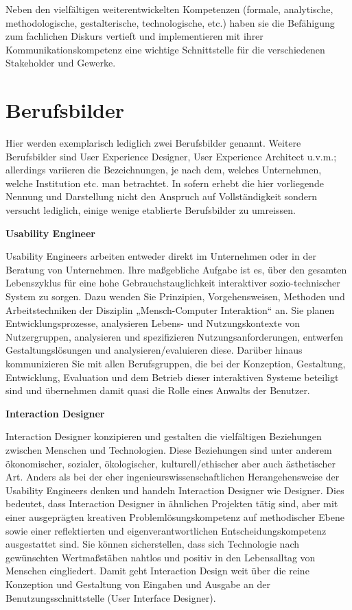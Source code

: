 Neben den vielfältigen weiterentwickelten Kompetenzen (formale,
analytische, methodologische, gestalterische, technologische, etc.)
haben sie die Befähigung zum fachlichen Diskurs vertieft und
implementieren mit ihrer Kommunikationskompetenz eine wichtige
Schnittstelle für die verschiedenen Stakeholder und Gewerke.

\section*{Berufsbilder\label{/mi-2017/modulbeschreibungen-master/schwerpunkt-human-computer-interaction}}\label{berufsbilderpathlabelmi-2017modulbeschreibungen-masterschwerpunkt-human-computer-interaction}

Hier werden exemplarisch lediglich zwei Berufsbilder genannt. Weitere
Berufsbilder sind User Experience Designer, User Experience Architect
u.v.m.; allerdings variieren die Bezeichnungen, je nach dem, welches
Unternehmen, welche Institution etc. man betrachtet. In sofern erhebt
die hier vorliegende Nennung und Darstellung nicht den Anspruch auf
Vollständigkeit sondern versucht lediglich, einige wenige etablierte
Berufsbilder zu umreissen.

\textbf{Usability Engineer}

Usability Engineers arbeiten entweder direkt im Unternehmen oder in der
Beratung von Unternehmen. Ihre maßgebliche Aufgabe ist es, über den
gesamten Lebenszyklus für eine hohe Gebrauchstauglichkeit interaktiver
sozio-technischer System zu sorgen. Dazu wenden Sie Prinzipien,
Vorgehensweisen, Methoden und Arbeitstechniken der Disziplin
„Mensch-Computer Interaktion`` an. Sie planen Entwicklungsprozesse,
analysieren Lebens- und Nutzungskontexte von Nutzergruppen, analysieren
und spezifizieren Nutzungsanforderungen, entwerfen Gestaltungslösungen
und analysieren/evaluieren diese. Darüber hinaus kommunizieren Sie mit
allen Berufsgruppen, die bei der Konzeption, Gestaltung, Entwicklung,
Evaluation und dem Betrieb dieser interaktiven Systeme beteiligt sind
und übernehmen damit quasi die Rolle eines Anwalts der Benutzer.

\textbf{Interaction Designer}

Interaction Designer konzipieren und gestalten die vielfältigen
Beziehungen zwischen Menschen und Technologien. Diese Beziehungen sind
unter anderem ökonomischer, sozialer, ökologischer, kulturell/ethischer
aber auch ästhetischer Art. Anders als bei der eher
ingenieurswissenschaftlichen Herangehensweise der Usability Engineers
denken und handeln Interaction Designer wie Designer. Dies bedeutet,
dass Interaction Designer in ähnlichen Projekten tätig sind, aber mit
einer ausgeprägten kreativen Problemlösungskompetenz auf methodischer
Ebene sowie einer reflektierten und eigenverantwortlichen
Entscheidungskompetenz ausgestattet sind. Sie können sicherstellen, dass
sich Technologie nach gewünschten Wertmaßstäben nahtlos und positiv in
den Lebensalltag von Menschen eingliedert. Damit geht Interaction Design
weit über die reine Konzeption und Gestaltung von Eingaben und Ausgabe
an der Benutzungsschnittstelle (User Interface Designer).

